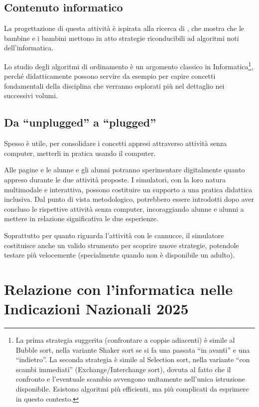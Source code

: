 \subsection{Contenuto informatico }\label{contenuto-informatico-10}

La progettazione di questa attività è ispirata alla ricerca di \textcite{yang-etal-2025}, che mostra che le bambine e i bambini mettono in atto strategie riconducibili ad algoritmi noti dell'informatica.

Lo studio degli algoritmi di ordinamento è un argomento classico in Informatica\footnote{La prima strategia suggerita (confrontare a coppie adiacenti) è simile al Bubble sort, nella variante Shaker sort se si fa una passata ``in avanti'' e una ``indietro''. La seconda strategia è simile al Selection sort, nella variante ``con scambi immediati'' (Exchange/Interchange sort), dovuta al fatto che il confronto e l'eventuale scambio avvengono unitamente nell'unica istruzione disponibile. Esistono algoritmi più efficienti, ma più complicati da esprimere in questo contesto.}, perché didatticamente possono servire da esempio per capire concetti fondamentali della disciplina che verranno esplorati più nel dettaglio nei successivi volumi.

\subsection{Da ``unplugged'' a ``plugged'' }\label{da-unpluggeda-plugged}

Spesso è utile, per consolidare i concetti appresi attraverso attività senza computer, metterli in pratica usando il computer.

Alle pagine  e  le alunne e gli alunni potranno sperimentare digitalmente quanto appreso durante le due attività proposte. I simulatori, con la loro natura multimodale e interattiva, possono costituire un supporto a una pratica didattica inclusiva. Dal punto di vista metodologico, potrebbero essere introdotti dopo aver concluso le rispettive attività senza computer, incoraggiando alunne e alunni a mettere in relazione significativa le due esperienze.

Soprattutto per quanto riguarda l'attività con le cannucce, il simulatore costituisce anche un valido strumento per scoprire nuove strategie, potendole testare più velocemente (specialmente quando non è disponibile un adulto).

\section{Relazione con l'informatica nelle Indicazioni Nazionali 2025 }\label{relazione-con-linformatica-nelle-indicazioni-nazionali-3}


